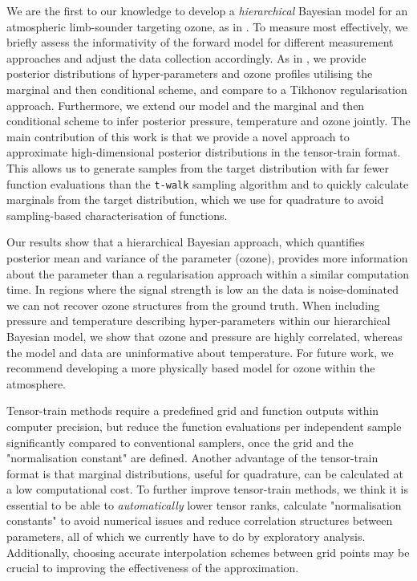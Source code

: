 We are the first to our knowledge to develop a \textit{hierarchical} Bayesian model for an atmospheric limb-sounder targeting ozone, as in \cite{mipas2000handbook}.
To measure most effectively, we briefly assess the informativity of the forward model for different measurement approaches and adjust the data collection accordingly.
As in \cite{fox2016fast}, we provide posterior distributions of hyper-parameters and ozone profiles utilising the marginal and then conditional scheme, and compare to a Tikhonov regularisation approach.
Furthermore, we extend our model and the marginal and then conditional scheme to infer posterior pressure, temperature and ozone jointly.
The main contribution of this work is that we provide a novel approach \cite{cui2022deep} to approximate high-dimensional posterior distributions in the tensor-train format.
This allows us to generate samples from the target distribution with far fewer function evaluations than the \texttt{t-walk} sampling algorithm \cite{christen2010general} and to quickly calculate marginals from the target distribution, which we use for quadrature to avoid sampling-based characterisation of functions.

Our results show that a hierarchical Bayesian approach, which quantifies posterior mean and variance of the parameter (ozone), provides more information about the parameter than a regularisation approach within a similar computation time.
In regions where the signal strength is low an the data is noise-dominated we can not recover ozone structures from the ground truth.
When including pressure and temperature describing hyper-parameters within our hierarchical Bayesian model, we show that ozone and pressure are highly correlated, whereas the model and data are uninformative about temperature.
For future work, we recommend developing a more physically based model for ozone within the atmosphere.

Tensor-train methods require a predefined grid and function outputs within computer precision, but reduce the function evaluations per independent sample significantly compared to conventional samplers, once the grid and the "normalisation constant" are defined.
Another advantage of the tensor-train format is that marginal distributions, useful for quadrature, can be calculated at a low computational cost.
To further improve tensor-train methods, we think it is essential to be able to \textit{automatically} lower tensor ranks, calculate "normalisation constants" to avoid numerical issues and reduce correlation structures between parameters, all of which we currently have to do by exploratory analysis.
Additionally, choosing accurate interpolation schemes between grid points may be crucial to improving the effectiveness of the approximation.